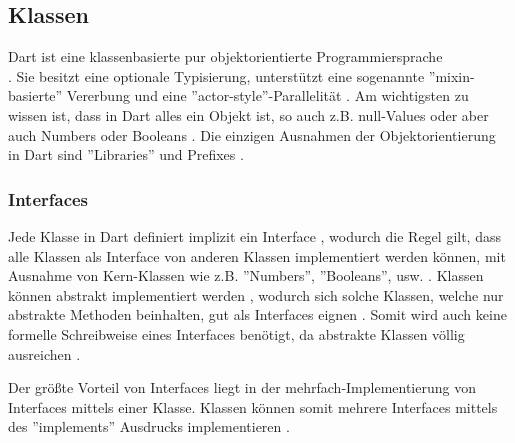 \subsection{Klassen}
\label{subsec:Dart:Klassen}
Dart ist eine klassenbasierte pur objektorientierte Programmiersprache \\\cite{article:Dart:JavaAndDart_AfafMirghaniHassan, book:Dart:StartGuideDart_SanjibSinha, book:Dart:DPL_GiladBracha}. Sie besitzt eine optionale Typisierung, unterstützt eine sogenannte ''mixin-basierte'' Vererbung und eine ''actor-style''-Parallelität \cite{book:Dart:DPL_GiladBracha}. Am wichtigsten zu wissen ist, dass in Dart alles ein Objekt ist, so auch z.B. null-Values oder aber auch Numbers oder Booleans \cite{article:Dart:JavaAndDart_AfafMirghaniHassan, book:Dart:DPL_GiladBracha, book:Dart:StartGuideDart_SanjibSinha}. Die einzigen Ausnahmen der Objektorientierung in Dart sind ''Libraries'' und Prefixes \cite{book:Dart:DPL_GiladBracha}.

    \subsubsection{Interfaces}
    \label{subsubsec:Dart:Klassen:Interfaces}
    Jede Klasse in Dart definiert implizit ein Interface \cite{book:Dart:DPL_GiladBracha, book:Dart:StartGuideDart_SanjibSinha}, wodurch die Regel gilt, dass alle Klassen als Interface von anderen Klassen implementiert werden können, mit Ausnahme von Kern-Klassen wie z.B. ''Numbers'', ''Booleans'', usw. \cite{book:Dart:DPL_GiladBracha}.
    Klassen können abstrakt implementiert werden \cite{book:Dart:StartGuideDart_SanjibSinha}, wodurch sich solche Klassen, welche nur abstrakte Methoden beinhalten, gut als Interfaces eignen \cite{book:Dart:DPL_GiladBracha}. Somit wird auch keine formelle Schreibweise eines Interfaces benötigt, da abstrakte Klassen völlig ausreichen \cite{book:Dart:DPL_GiladBracha}.

    \noindent
    Der größte Vorteil von Interfaces liegt in der mehrfach-Implementierung von Interfaces mittels einer Klasse. Klassen können somit mehrere Interfaces mittels des ''implements'' Ausdrucks implementieren \cite{book:Dart:StartGuideDart_SanjibSinha, book:Dart:DPL_GiladBracha}.
    
